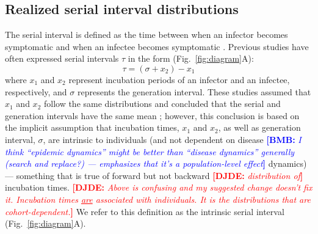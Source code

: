 \documentclass[12pt]{article}
\newcommand{\comment}{\showcomment}
\newcommand{\showcomment}[3]{\textcolor{#1}{\textbf{[#2: }\textsl{#3}\textbf{]}}}
\newcommand{\bmb}[1]{\comment{blue}{BMB}{#1}}
\newcommand{\djde}[1]{\comment{red}{DJDE}{#1}}
\newcommand{\fref}[1]{Fig.~\ref{fig:#1}}
\newcommand{\gtime}{\sigma} %
\begin{document}
\subsection{Realized serial interval distributions}

The serial interval is defined as the time between when an infector becomes symptomatic and when an infectee becomes symptomatic \citep{svensson2007note}.
Previous studies have often expressed serial intervals $\tau$ in the form (\fref{diagram}A):
\begin{equation}
\tau = (\gtime + x_2) - x_1
\end{equation}
where $x_1$ and $x_2$ represent incubation periods of an infector and
an infectee, respectively, and $\gtime$ represents the generation
interval.  These studies assumed that $x_1$ and $x_2$ follow the same
distributions and concluded that the serial and generation intervals
have the same mean
\citep{svensson2007note,klinkenberg2011correlation,champredon2018equivalence,
  britton2019estimation}; however, this conclusion is based on the
implicit assumption that incubation times, $x_1$ and $x_2$, as well as
generation interval, $\gtime$, are intrinsic to individuals (and not
dependent on disease \bmb{I think ``epidemic dynamics'' might be
  better than ``disease dynamics'' generally (search and replace?) ---
  emphasizes that it's a population-level effect} dynamics) ---
something that is true of forward but not backward \djde{distribution
  of} incubation times.  \djde{Above is confusing and my suggested
  change doesn't fix it.  Incubation times \underline{are} associated
  with individuals.  It is the distributions that are
  cohort-dependent.}  We refer to this definition as the intrinsic
serial interval (\fref{diagram}A).
\end{document}
